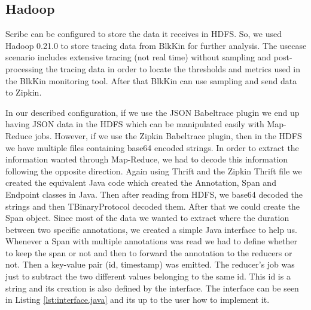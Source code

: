 \subsection{Hadoop}
Scribe can be configured to store the data it receives in HDFS. So, we used
Hadoop 0.21.0 to store tracing data from BlkKin for further analysis. The
usecase scenario includes extensive tracing (not real time) without sampling and
post-processing the tracing data in order to locate the thresholds and metrics
used in the BlkKin monitoring tool. After that BlkKin can use sampling and send
data to Zipkin.

In our described configuration, if we use the JSON Babeltrace plugin we end up
having JSON data in the HDFS which can be manipulated easily with Map-Reduce
jobs. However, if we use the Zipkin Babeltrace plugin, then in the HDFS we have
multiple files containing base64 encoded strings. In order to extract the
information wanted through Map-Reduce, we had to decode this information
following the opposite direction. Again using Thrift and the Zipkin Thrift
file we created the equivalent Java code which created the Annotation, Span and
Endpoint classes in Java. Then after reading from HDFS, we base64 decoded the
strings and then TBinaryProtocol decoded them. After that we could create the
Span object. Since most of the data we wanted to extract where the duration
between two specific annotations, we created a simple Java interface to help us.
Whenever a Span with multiple annotations was read we had to define whether to
keep the span or not and then to forward the annotation to the reducers or not.
Then a key-value pair (id, timestamp) was emitted. The reducer's job was just to
subtract the two different values belonging to the same id. This id is a string
and its creation is also defined by the interface. The interface can be seen in
Listing \ref{lst:interface.java} and its up to the user how to implement it.

